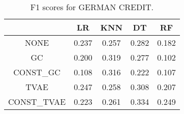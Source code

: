 \begin{table}
\caption{F1 scores for GERMAN CREDIT.}
\label{tab:f1-GERMAN CREDIT}
\begin{tabular}{ccccc}
\toprule
 & LR & KNN & DT & RF \\
\midrule
NONE & 0.237 & 0.257 & 0.282 & 0.182 \\
GC & 0.200 & 0.319 & 0.277 & 0.102 \\
CONST\_GC & 0.108 & 0.316 & 0.222 & 0.107 \\
TVAE & 0.247 & 0.258 & 0.308 & 0.207 \\
CONST\_TVAE & 0.223 & 0.261 & 0.334 & 0.249 \\
\bottomrule
\end{tabular}
\end{table}
